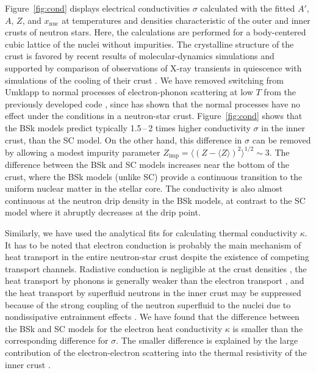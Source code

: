\documentclass{aa}
\begin{document}
Figure~\ref{fig:cond} displays electrical conductivities
$\sigma$ calculated with the fitted $A'$, $A$, $Z$, and
$x_\mathrm{nuc}$ at temperatures and densities
characteristic of the outer and inner crusts of neutron
stars. Here, the calculations are performed for a
body-centered cubic lattice of the nuclei without
impurities. The crystalline structure of the crust is
favored by recent results of molecular-dynamics simulations
\citep{Hughto-ea11} and supported by comparison of 
observations of X-ray transients in quiescence with
simulations of the cooling of their crust
\citep{Shternin-ea07,Cackett-ea10}. We have removed
switching from Umklapp to normal processes of
electron-phonon scattering at low $T$ from the previously
developed code \citep{GYP}, since  \citet{Chugunov12} has
shown that the normal processes have no effect under the
conditions in a neutron-star crust. Figure~\ref{fig:cond}
shows that the BSk models predict typically 1.5\,--\,2 times
higher conductivity $\sigma$ in the inner crust, than the SC
model. On the other hand, this
difference in $\sigma$ can be removed by allowing a
modest impurity parameter  $Z_\mathrm{imp} = \langle
(Z-\langle Z\rangle)^2 \rangle^{1/2} \sim 3$. The
difference between the BSk and SC models increases
near the bottom of the crust, where the
BSk models (unlike SC) provide a continuous transition to the
uniform nuclear matter in the stellar core.
The conductivity is also almost
continuous at the neutron drip density in the BSk models, at
contrast to the SC model where it abruptly
decreases at the drip point. 

Similarly, we have used the analytical fits for calculating thermal
conductivity $\kappa$. It has to be noted that electron
conduction is probably the main mechanism of heat
transport in the entire neutron-star crust despite the
existence of competing transport channels. Radiative conduction is
negligible at the crust densities
\citep{PotekhinYakovlev01,Perez-ea06}, the heat transport by
phonons is generally weaker than the electron transport 
\citep{Perez-ea06,ChugunovHaensel07}, and the heat transport
by superfluid neutrons in the inner crust 
\citep{BisnoRomanova,Aguilera-ea09} may be suppressed because
of the strong coupling of the neutron superfluid to the
nuclei due to nondissipative entrainment effects
\citep{Chamel12}. We have found that the difference between
the BSk and SC models for the electron heat conductivity
$\kappa$ is smaller than the corresponding difference for
$\sigma$. The smaller difference is explained by the large contribution of
 the electron-electron scattering into the thermal
resistivity of the inner crust \citep{ShterninYakovlev06}. 
\end{document}
